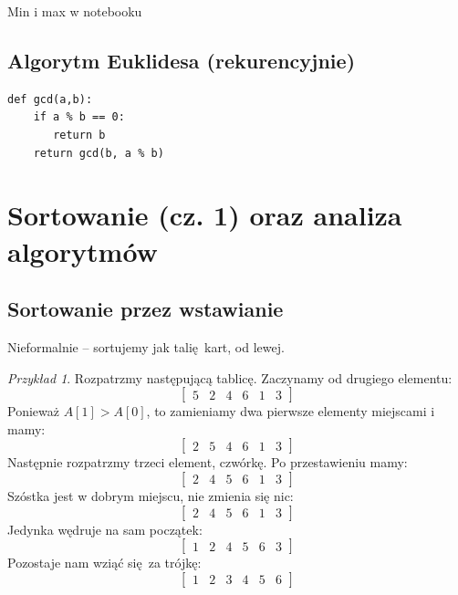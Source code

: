 \documentclass[10pt, oneside]{article}
\theoremstyle{remark}
\newtheorem*{example}{Przykład}
\begin{document}
Min i max w notebooku

\subsection{Algorytm Euklidesa (rekurencyjnie)}

\begin{verbatim}
def gcd(a,b):
    if a % b == 0:
       return b
    return gcd(b, a % b)
\end{verbatim}

\section{Sortowanie (cz. 1) oraz analiza algorytmów}

\subsection{Sortowanie przez wstawianie}

Nieformalnie -- sortujemy jak talię kart, od lewej.

\begin{example}
Rozpatrzmy następującą tablicę. Zaczynamy od drugiego elementu:
$$\begin{bmatrix}
	5 & 2 & 4 & 6 & 1 & 3
\end{bmatrix}$$
Ponieważ $A[1] > A[0]$, to zamieniamy dwa pierwsze elementy miejscami i mamy:
$$\begin{bmatrix}
	2 & 5 & 4 & 6 & 1 & 3
\end{bmatrix}$$
Następnie rozpatrzmy trzeci element, czwórkę. Po przestawieniu mamy:
$$\begin{bmatrix}
	2 & 4 & 5 & 6 & 1 & 3
\end{bmatrix}$$
Szóstka jest w dobrym miejscu, nie zmienia się nic:
$$\begin{bmatrix}
	2 & 4 & 5 & 6 & 1 & 3
\end{bmatrix}$$
Jedynka wędruje na sam początek:
$$\begin{bmatrix}
	1 & 2 & 4 & 5 & 6 & 3
\end{bmatrix}$$
Pozostaje nam wziąć się za trójkę:
$$\begin{bmatrix}
	1 & 2 & 3 & 4 & 5 & 6
\end{bmatrix}$$
\end{example}
\end{document}
